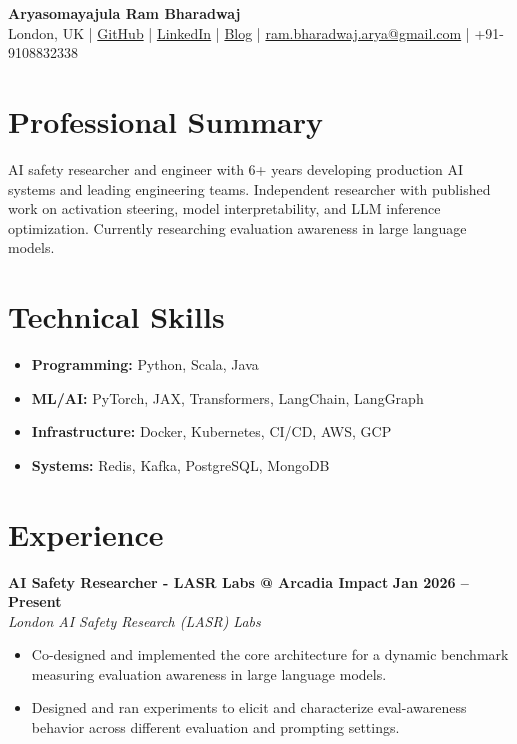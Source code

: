 \documentclass[11pt]{article}
\begin{document}
\begin{center}
\textbf{\Large Aryasomayajula Ram Bharadwaj} \\
\vspace{4pt}
London, UK | \href{https://github.com/arambharadwaj}{GitHub} | \href{https://www.linkedin.com/in/arbharadwaj97/}{LinkedIn} | \href{https://fullwrong.com}{Blog} | \href{mailto:ram.bharadwaj.arya@gmail.com}{ram.bharadwaj.arya@gmail.com} | +91-9108832338
\end{center}

\vspace{8pt}
\section{Professional Summary}
AI safety researcher and engineer with 6+ years developing production AI systems and leading engineering teams. Independent researcher with published work on activation steering, model interpretability, and LLM inference optimization. Currently researching evaluation awareness in large language models.

\section{Technical Skills}
\begin{itemize}[leftmargin=*, nosep]
\item \textbf{Programming:} Python, Scala, Java
\item \textbf{ML/AI:} PyTorch, JAX, Transformers, LangChain, LangGraph
\item \textbf{Infrastructure:} Docker, Kubernetes, CI/CD, AWS, GCP
\item \textbf{Systems:} Redis, Kafka, PostgreSQL, MongoDB
\end{itemize}

\section{Experience}

\textbf{AI Safety Researcher - LASR Labs @ Arcadia Impact} \hfill \textbf{Jan 2026 -- Present} \\
\textit{London AI Safety Research (LASR) Labs}
\begin{itemize}[leftmargin=*, nosep]
\item Co-designed and implemented the core architecture for a dynamic benchmark measuring evaluation awareness in large language models.
\item Designed and ran experiments to elicit and characterize eval-awareness behavior across different evaluation and prompting settings.
\end{itemize}
\end{document}
